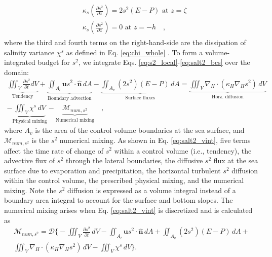 \begin{align} 
    \begin{split}
        & \kappa_s \left({\frac{\partial s^2}{\partial z}} \right) = 2s^2(E-P) \,\, \textrm{at} \,\, z = \zeta \\
        & \kappa_s \left({\frac{\partial s^2}{\partial z}} \right) = 0 \,\, \textrm{at} \,\, z = -h \label{eq:salt2_bcs} \quad ,
    \end{split}
\end{align}
where the third and fourth terms on the right-hand-side are the dissipation of salinity variance $\chi^s$ as defined in Eq. \ref{eq:chi_whole} \citep{Burchard_2008}. To form a volume-integrated budget for $s^2$, we integrate Eqs. \ref{eq:s2_local}-\ref{eq:salt2_bcs} over the domain:
\begin{equation} \label{eq:salt2_vint}
    \begin{split}
        \underbrace{\iiint_V \frac{\partial s^2}{\partial t}  dV}_{\text{Tendency}} + \underbrace{\iint_{A_l} \mathbf{u}s^2 \cdot \hat{\mathbf{n}} \,  dA}_{\text{Boundary advection}}  - \underbrace{\iint_{A_{v}} \left(2s^2 \right)(E-P) \, dA}_{\text{Surface fluxes}} = \underbrace{\iiint_{V} \nabla_H \cdot (\kappa_H \nabla_H s^2) \, dV}_{\text{Horz. diffusion}}\\
        -\underbrace{\iiint_V \chi^s \, dV}_{\text{Physical mixing}}-\underbrace{\mathcal{M}_{num, s^2}}_{\text{Numerical mixing}} \quad ,
   \end{split}
\end{equation}
where $A_v$ is the area of the control volume boundaries at the sea surface, and $\mathcal{M}_{num, s^2}$ is the $s^2$ numerical mixing. As shown in Eq. \ref{eq:salt2_vint}, five terms affect the time rate of change of $s^2$ within a control volume (i.e., tendency), the advective flux of $s^2$ through the lateral boundaries, the diffusive $s^2$ flux at the sea surface due to evaporation and precipitation, the horizontal turbulent $s^2$ diffusion within the control volume, the prescribed physical mixing, and the numerical mixing. Note the $s^2$ diffusion is expressed as a volume integral instead of a boundary area integral to account for the surface and bottom slopes. The numerical mixing arises when Eq. \ref{eq:salt2_vint} is discretized and is calculated as 
\begin{equation} \label{eq:salt2_mnum}
    \begin{split}
        \mathcal{M}_{num, s^2} = \mathcal{D} \biggl\{-\iiint_V \frac{\partial s^2}{\partial t} \, dV - \iint_{A_l} \mathbf{u}s^2 \cdot \hat{\mathbf{n}} \,  dA + \iint_{A_{v}} \left(2s^2 \right)(E-P) \, dA + \\
        \iiint_{V} \nabla_H \cdot \left(\kappa_H \nabla_H s^2 \right) \, dV - \iiint_V \chi^s \, dV\biggl\}.
   \end{split}
\end{equation}
